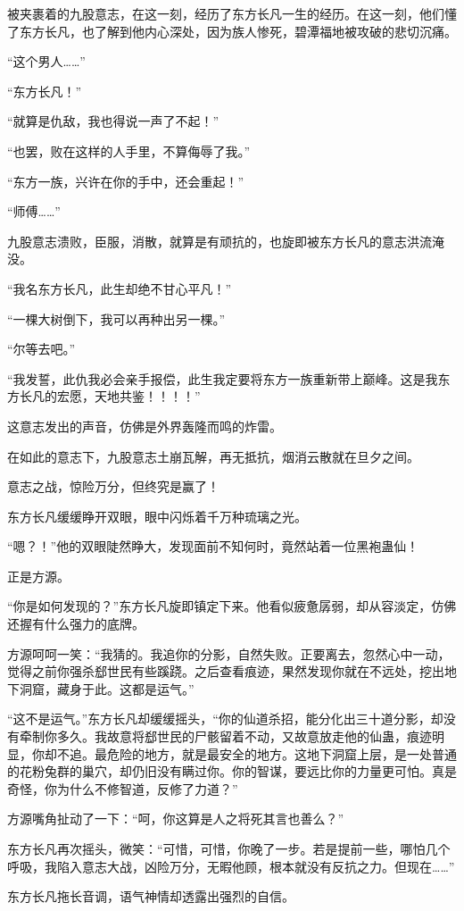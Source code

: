 \begin{this_body}
被夹裹着的九股意志，在这一刻，经历了东方长凡一生的经历。在这一刻，他们懂了东方长凡，也了解到他内心深处，因为族人惨死，碧潭福地被攻破的悲切沉痛。

“这个男人……”

“东方长凡！”

“就算是仇敌，我也得说一声了不起！”

“也罢，败在这样的人手里，不算侮辱了我。”

“东方一族，兴许在你的手中，还会重起！”

“师傅……”

九股意志溃败，臣服，消散，就算是有顽抗的，也旋即被东方长凡的意志洪流淹没。

“我名东方长凡，此生却绝不甘心平凡！”

“一棵大树倒下，我可以再种出另一棵。”

“尔等去吧。”

“我发誓，此仇我必会亲手报偿，此生我定要将东方一族重新带上巅峰。这是我东方长凡的宏愿，天地共鉴！！！！”

这意志发出的声音，仿佛是外界轰隆而鸣的炸雷。

在如此的意志下，九股意志土崩瓦解，再无抵抗，烟消云散就在旦夕之间。

意志之战，惊险万分，但终究是赢了！

东方长凡缓缓睁开双眼，眼中闪烁着千万种琉璃之光。

“嗯？！”他的双眼陡然睁大，发现面前不知何时，竟然站着一位黑袍蛊仙！

正是方源。

“你是如何发现的？”东方长凡旋即镇定下来。他看似疲惫孱弱，却从容淡定，仿佛还握有什么强力的底牌。

方源呵呵一笑：“我猜的。我追你的分影，自然失败。正要离去，忽然心中一动，觉得之前你强杀郄世民有些蹊跷。之后查看痕迹，果然发现你就在不远处，挖出地下洞窟，藏身于此。这都是运气。”

“这不是运气。”东方长凡却缓缓摇头，“你的仙道杀招，能分化出三十道分影，却没有牵制你多久。我故意将郄世民的尸骸留着不动，又故意放走他的仙蛊，痕迹明显，你却不追。最危险的地方，就是最安全的地方。这地下洞窟上层，是一处普通的花粉兔群的巢穴，却仍旧没有瞒过你。你的智谋，要远比你的力量更可怕。真是奇怪，你为什么不修智道，反修了力道？”

方源嘴角扯动了一下：“呵，你这算是人之将死其言也善么？”

东方长凡再次摇头，微笑：“可惜，可惜，你晚了一步。若是提前一些，哪怕几个呼吸，我陷入意志大战，凶险万分，无暇他顾，根本就没有反抗之力。但现在……”

东方长凡拖长音调，语气神情却透露出强烈的自信。


\end{this_body}
